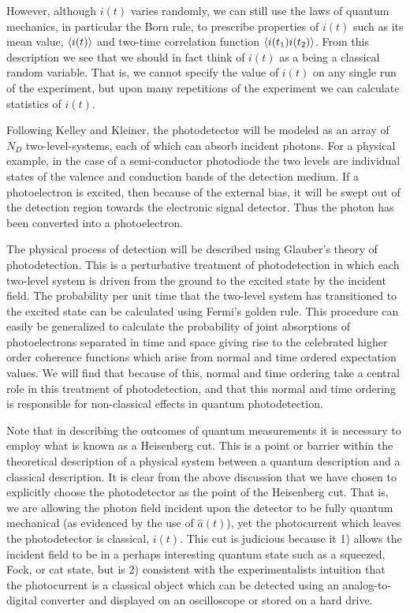 \documentclass[12pt]{article}
\begin{document}
However, although $i(t)$ varies randomly, we can still use the laws of quantum mechanics, in particular the Born rule, to prescribe properties of $i(t)$ such as its mean value, $\Braket{i(t)}$ and two-time correlation function $\Braket{i(t_1)i(t_2)}$. From this description we see that we should in fact think of $i(t)$ as a being a classical random variable. That is, we cannot specify the value of $i(t)$ on any single run of the experiment, but upon many repetitions of the experiment we can calculate statistics of $i(t)$.

Following Kelley and Kleiner\cite{Kelley1964}, the photodetector will be modeled as an array of $N_D$ two-level-systems, each of which can absorb incident photons. For a physical example, in the case of a semi-conductor photodiode the two levels are individual states of the valence and conduction bands of the detection medium. If a photoelectron is excited, then because of the external bias, it will be swept out of the detection region towards the electronic signal detector. Thus the photon has been converted into a photoelectron.

The physical process of detection will be described using Glauber's theory of photodetection\cite{Glauber1963}. This is a perturbative treatment of photodetection in which each two-level system is driven from the ground to the excited state by the incident field. The probability per unit time that the two-level system has transitioned to the excited state can be calculated using Fermi's golden rule. This procedure can easily be generalized to calculate the probability of joint absorptions of photoelectrons separated in time and space giving rise to the celebrated higher order coherence functions which arise from normal and time ordered expectation values. We will find that because of this, normal and time ordering take a central role in this treatment of photodetection, and that this normal and time ordering is responsible for non-classical effects in quantum photodetection.

Note that in describing the outcomes of quantum measurements it is necessary to employ what is known as a Heisenberg cut. This is a point or barrier within the theoretical description of a physical system between a quantum description and a classical description. It is clear from the above discussion that we have chosen to explicitly choose the photodetector as the point of the Heisenberg cut. That is, we are allowing the photon field incident upon the detector to be fully quantum mechanical (as evidenced by the use of $\hat{a}(t)$), yet the photocurrent which leaves the photodetector is classical, $i(t)$. This cut is judicious because it 1) allows the incident field to be in a perhaps interesting quantum state such as a squeezed, Fock, or cat state, but is 2) consistent with the experimentalists intuition that the photocurrent is a classical object which can be detected using an analog-to-digital converter and displayed on an oscilloscope or stored on a hard drive.
\end{document}
